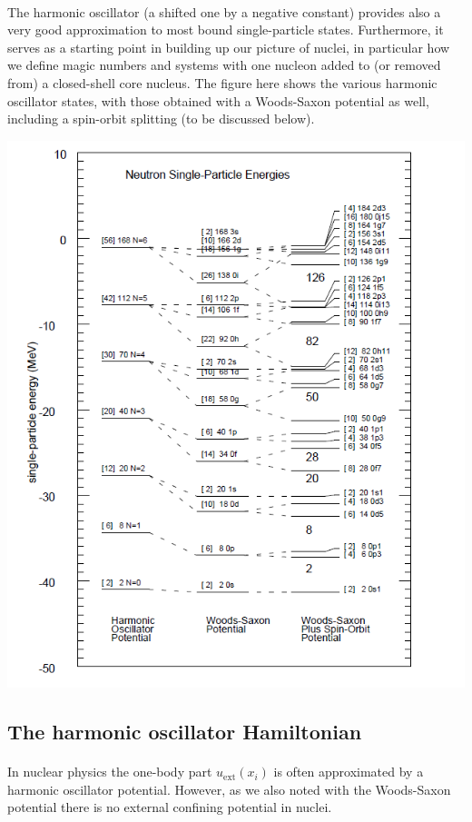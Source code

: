 \documentclass[%
twoside,                 %
final,                   %
10pt]{article}
\begin{document}
\paragraph{}
The harmonic oscillator (a shifted one by a negative constant) provides also a very good approximation to most bound single-particle states. Furthermore, it serves as a starting point in building up our picture of nuclei, in particular how we define magic numbers and systems with one nucleon added to (or removed from) a closed-shell core nucleus. The figure here shows 
the various harmonic oscillator states, with those obtained with a Woods-Saxon potential as well, including a spin-orbit splitting (to be discussed below).


\centerline{\includegraphics[width=0.6\linewidth]{figslides/singleparticle.png}}









\subsection*{The harmonic oscillator Hamiltonian}

\paragraph{}
In nuclear physics the one-body part $u_{\mathrm{ext}}(x_i)$ is often 
approximated by a harmonic oscillator potential. However,  as we also noted with the Woods-Saxon potential there is no 
external confining potential in nuclei. 
\end{document}
